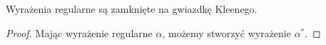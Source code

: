 \begin{theorem}
    Wyrażenia regularne są zamknięte na gwiazdkę Kleenego.
\end{theorem}

\begin{proof}
    Mając wyrażenie regularne \(\alpha\), możemy stworzyć wyrażenie \(\alpha^*\).
\end{proof}